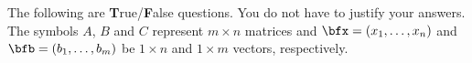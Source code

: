 \newcommand{\tf}[1][{}]{%
\fillin[#1][0.25in]%
}

\begin{questions}
  \question The following are \textbf{T}rue/\textbf{F}alse
  questions. You do not have to justify your answers. The symbols $A$, $B$
  and $C$ represent $m\times n$ matrices and $\bfx=(x_1,\dotsc,x_n)$ and
  $\bfb=(b_1,\dotsc,b_m)$ be $1\times n$ and $1\times m$ vectors,
  respectively.
  \\
\end{questions}

